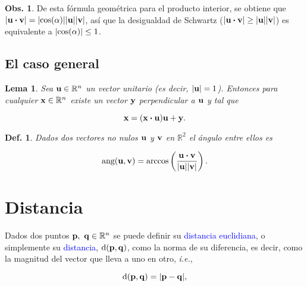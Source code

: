\documentclass{article}
\theoremstyle{definicion}
\newtheorem{definicion}{Def.}
\theoremstyle{definition}             %
\theoremstyle{definition}             %
\theoremstyle{definition}
\theoremstyle{definition}
\theoremstyle{observacion}
\newtheorem{obs}{Obs.}
\theoremstyle{definition}
\theoremstyle{plain}
\newtheorem{lemma}{Lema}
\theoremstyle{definition}
\theoremstyle{afirmacion}
\theoremstyle{notation}
\theoremstyle{definition}
\begin{document}
        \begin{obs}
            De esta fórmula geométrica para el producto interior, se obtiene que \(\abs{\vb{u} \vdot \vb{v}} = \abs{\cos(\alpha)}\abs{\vb{u}}\abs{\vb{v}}\), así que la desigualdad de Schwartz (\(\abs{\vb{u} \vdot \vb{v}} \geq \abs{\vb{u}}\abs{\vb{v}}\)) es equivalente a \(\abs{\cos(\alpha)} \leq 1\).
        \end{obs}

        \subsection{El caso general}

        \begin{lemma}
            Sea \(\vb{u} \in \mathbb{R}^{n}\) un vector unitario (es decir, \(\abs{\vb{u}} = 1\)). Entonces para cualquier \(\vb{x} \in \mathbb{R}^{n}\) existe un vector \(\vb{y}\) perpendicular a \(\vb{u}\) y tal que 

            \begin{equation*}
                \vb{x} = (\vb{x} \vdot \vb{u}) \vb{u} + \vb{y}.
            \end{equation*}
        \end{lemma}

        \begin{definicion}
            Dados dos vectores no nulos \(\vb{u}\) y \(\vb{v}\) en \(\mathbb{R}^{2}\) el ángulo entre ellos es

            \begin{equation*}
                \textrm{ang}(\vb{u}, \vb{v}) = \arccos\left(\dfrac{\vb{u} \vdot \vb{v}}{\abs{\vb{u}}\abs{\vb{v}}}\right).
            \end{equation*}
        \end{definicion}

        \section{Distancia}

        Dados dos puntos \(\vb{p},\ \vb{q} \in \mathbb{R}^{n}\) se puede definir su \textcolor{blue}{distancia euclidiana}, o simplemente su \textcolor{blue}{distancia}, \(\textrm{d}(\vb{p}, \vb{q})\), como la norma de su diferencia, es decir, como la magnitud del vector que lleva a uno en otro, \emph{i.e.}, 

        \begin{equation*}
            \textrm{d}(\vb{p}, \vb{q}) = \abs{\vb{p} - \vb{q}},
        \end{equation*}
\end{document}

